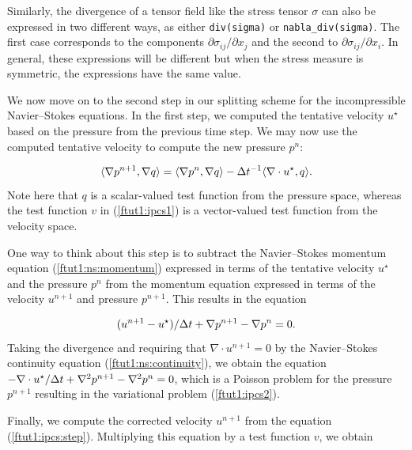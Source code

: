 \documentclass[graybox,envcountchap,sectrefs,final]{svmonodo}
\newenvironment{warning_mdfboxadmon}[1][]{
\begin{warning_mdfboxmdframed}[frametitle=#1]
}
{
\end{warning_mdfboxmdframed}
}
\begin{document}
\begin{warning_mdfboxadmon}
Similarly, the divergence of a tensor field like the stress tensor
$\sigma$ can also be expressed in two different ways, as either
\texttt{div(sigma)} or \Verb!nabla_div(sigma)!. The first case corresponds to the
components $\partial \sigma_{ij}/{\partial x_j}$ and the second to
$\partial \sigma_{ij}/{\partial x_i}$. In general, these expressions
will be different but when the stress measure is symmetric, the
expressions have the same value.
\end{warning_mdfboxadmon} %



We now move on to the second step in our splitting scheme for the
incompressible Navier--Stokes equations. In the first step, we computed
the tentative velocity $u^{\star}$ based on the pressure from the
previous time step. We may now use the computed tentative velocity to
compute the new pressure $p^n$:

\begin{equation}
\label{ftut1:ipcs2}
  \langle \nabla p^{n+1}, \nabla q \rangle
  = \langle {\nabla p^{n}},{\nabla q} \rangle
  - \dt^{-1} \langle{\nabla \cdot u^{\star}},{q} \rangle.
\end{equation}
Note here that $q$ is a scalar-valued test function from the pressure
space, whereas the test function $v$ in (\ref{ftut1:ipcs1}) is a
vector-valued test function from the velocity space.

One way to think about this step is to subtract the Navier--Stokes
momentum equation (\ref{ftut1:ns:momentum}) expressed in terms of the
tentative velocity $u^{\star}$ and the pressure $p^n$ from the
momentum equation expressed in terms of the velocity $u^{n+1}$ and
pressure $p^{n+1}$. This results in the equation

\begin{equation} \label{ftut1:ipcs:step}
  (u^{n+1} - u^{\star}) / \dt + \nabla p^{n+1} - \nabla p^n = 0.
\end{equation}
Taking the divergence and requiring that $\nabla \cdot u^{n+1} = 0$ by the
Navier--Stokes continuity equation (\ref{ftut1:ns:continuity}), we
obtain the equation $-\nabla\cdot u^{\star} / \dt + \nabla^2 p^{n+1} -
\nabla^2 p^n = 0$, which is a Poisson problem for the pressure $p^{n+1}$
resulting in the variational problem (\ref{ftut1:ipcs2}).

Finally, we compute the corrected velocity $u^{n+1}$ from the equation
(\ref{ftut1:ipcs:step}). Multiplying this equation by a test function
$v$, we obtain
\end{document}
